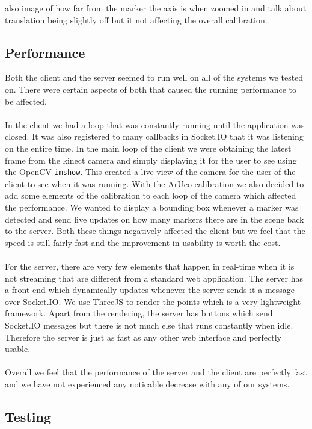 \documentclass{article}
\begin{document}
also image of how far from the marker the axis is when zoomed in and talk about translation being slightly off but it not affecting the overall calibration.
\subsection{Performance}
Both the client and the server seemed to run well on all of the systems we tested on. There were certain aspects of both that caused the running performance to be affected.
\\\\
In the client we had a loop that was constantly running until the application was closed. It was also registered to many callbacks in Socket.IO that it was listening on the entire time. In the main loop of the client we were obtaining the latest frame from the kinect camera and simply displaying it for the user to see using the OpenCV \texttt{imshow}. This created a live view of the camera for the user of the client to see when it was running. With the ArUco calibration we also decided to add some elements of the calibration to each loop of the camera which affected the performance. We wanted to display a bounding box whenever a marker was detected and send live updates on how many markers there are in the scene back to the server. Both these things negatively affected the client but we feel that the speed is still fairly fast and the improvement in usability is worth the cost.
\\\\
For the server, there are very few elements that happen in real-time when it is not streaming that are different from a standard web application. The server has a front end which dynamically updates whenever the server sends it a message over Socket.IO. We use ThreeJS to render the points which is a very lightweight framework. Apart from the rendering, the server has buttons which send Socket.IO messages but there is not much else that runs constantly when idle. Therefore the server is just as fast as any other web interface and perfectly usable.
\\\\
Overall we feel that the performance of the server and the client are perfectly fast and we have not experienced any noticable decrease with any of our systems.
\subsection{Testing}
\end{document}
